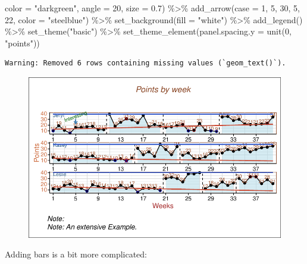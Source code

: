 \documentclass[
  letterpaper,
  DIV=11,
  numbers=noendperiod]{scrreprt}
\newenvironment{Shaded}{\begin{snugshade}}{\end{snugshade}}
\newcommand{\AttributeTok}[1]{\textcolor[rgb]{0.40,0.45,0.13}{#1}}
\newcommand{\DecValTok}[1]{\textcolor[rgb]{0.68,0.00,0.00}{#1}}
\newcommand{\FloatTok}[1]{\textcolor[rgb]{0.68,0.00,0.00}{#1}}
\newcommand{\FunctionTok}[1]{\textcolor[rgb]{0.28,0.35,0.67}{#1}}
\newcommand{\NormalTok}[1]{\textcolor[rgb]{0.00,0.23,0.31}{#1}}
\newcommand{\SpecialCharTok}[1]{\textcolor[rgb]{0.37,0.37,0.37}{#1}}
\newcommand{\StringTok}[1]{\textcolor[rgb]{0.13,0.47,0.30}{#1}}
\begin{document}
\begin{Shaded}
\begin{Highlighting}[]
           \AttributeTok{color =} \StringTok{"darkgreen"}\NormalTok{, }\AttributeTok{angle =} \DecValTok{20}\NormalTok{, }\AttributeTok{size =} \FloatTok{0.7}\NormalTok{) }\SpecialCharTok{\%\textgreater{}\%}
  \FunctionTok{add\_arrow}\NormalTok{(}\AttributeTok{case =} \DecValTok{1}\NormalTok{, }\DecValTok{5}\NormalTok{, }\DecValTok{30}\NormalTok{, }\DecValTok{5}\NormalTok{, }\DecValTok{22}\NormalTok{, }\AttributeTok{color =} \StringTok{"steelblue"}\NormalTok{) }\SpecialCharTok{\%\textgreater{}\%}
  \FunctionTok{set\_background}\NormalTok{(}\AttributeTok{fill =} \StringTok{"white"}\NormalTok{) }\SpecialCharTok{\%\textgreater{}\%}
  \FunctionTok{add\_legend}\NormalTok{() }\SpecialCharTok{\%\textgreater{}\%}
  \FunctionTok{set\_theme}\NormalTok{(}\StringTok{"basic"}\NormalTok{) }\SpecialCharTok{\%\textgreater{}\%}
  \FunctionTok{set\_theme\_element}\NormalTok{(}\AttributeTok{panel.spacing.y =} \FunctionTok{unit}\NormalTok{(}\DecValTok{0}\NormalTok{, }\StringTok{"points"}\NormalTok{))}
\end{Highlighting}
\end{Shaded}

\begin{verbatim}
Warning: Removed 6 rows containing missing values (`geom_text()`).
\end{verbatim}

\begin{figure}[H]

{\centering \includegraphics{./ch_scplot_files/figure-pdf/complex3-1.pdf}

}

\end{figure}

Adding bars is a bit more complicated:
\end{document}
